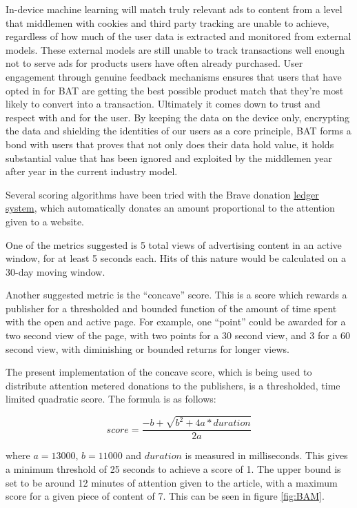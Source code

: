 \documentclass[11pt]{article}
\begin{document}
In-device machine learning will match truly relevant ads to content from a level that middlemen with cookies and third party tracking are unable to achieve, regardless of how much of the user data is extracted and monitored from external models. These external models are still unable to track transactions well enough not to serve ads for products users have often already purchased. User engagement through genuine feedback mechanisms ensures that users that have opted in for \textrm{BAT} are getting the best possible product match that they're most likely to convert into a transaction. Ultimately it comes down to trust and respect with and for the user. By keeping the data on the device only, encrypting the data and shielding the identities of our users as a core principle, \textrm{BAT} forms a bond with users that proves that not only does their data hold value, it holds substantial value that has been ignored and exploited by the middlemen year after year in the current industry model. 

 Several scoring algorithms have been tried with the Brave donation \href{https://github.com/brave/ledger-publisher}{ledger system}, which automatically donates an amount proportional to the attention given to a website. 

One of the metrics suggested is 5 total views of advertising content in an active window, for at least 5 seconds each. Hits of this nature would be calculated on a 30-day moving window. 

Another suggested metric is the ``concave'' score\cite{PubClient}. This is a score which rewards a publisher for a thresholded and bounded function of the amount of time spent with the open and active page.  For example, one ``point'' could be awarded for a two second view of the page, with two points for a 30 second view, and 3 for a 60 second view, with diminishing or bounded returns for longer views.

The present implementation of the concave score, which is being used to distribute attention metered donations to the publishers, is a thresholded, time limited quadratic score. The formula is as follows:

\[ score= \frac{-b + \sqrt{b^2 + 4a*duration}}{2a}\]

where $a=13000$, $b=11000 $ and $duration$ is measured in
milliseconds. This gives a minimum threshold of 25 seconds to achieve
a score of 1. The upper bound is set to be around 12 minutes of
attention given to the article, with a maximum score for a given piece
of content of 7. This can be seen in figure \ref{fig:BAM}.
\end{document}
